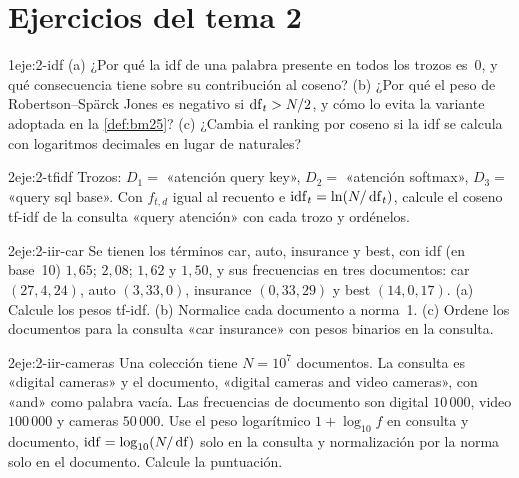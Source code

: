 \section*{Ejercicios del tema 2}

\begin{ejercicio}{1}{eje:2-idf}
(a) ¿Por qué la idf de una palabra presente en todos los trozos es~0, y qué consecuencia tiene sobre su contribución al coseno? (b) ¿Por qué el peso de Robertson--Spärck Jones es negativo si $\operatorname{df}_t>N/2$, y cómo lo evita la variante adoptada en la \cref{def:bm25}? (c) ¿Cambia el ranking por coseno si la idf se calcula con logaritmos decimales en lugar de naturales?
\end{ejercicio}

\begin{ejercicio}{2}{eje:2-tfidf}
Trozos: $D_1=$ «atención query key», $D_2=$ «atención softmax», $D_3=$ «query sql base». Con $f_{t,d}$ igual al recuento e $\operatorname{idf}_t=\ln(N/\operatorname{df}_t)$, calcule el coseno tf-idf de la consulta «query atención» con cada trozo y ordénelos.
\end{ejercicio}

\begin{ejercicio}{2}{eje:2-iir-car}
Se tienen los términos car, auto, insurance y best, con idf (en base~10) $1{,}65$; $2{,}08$; $1{,}62$ y $1{,}50$, y sus frecuencias en tres documentos: car $(27,4,24)$, auto $(3,33,0)$, insurance $(0,33,29)$ y best $(14,0,17)$. (a) Calcule los pesos tf-idf. (b) Normalice cada documento a norma~1. (c) Ordene los documentos para la consulta «car insurance» con pesos binarios en la consulta.
\end{ejercicio}

\begin{ejercicio}{2}{eje:2-iir-cameras}
Una colección tiene $N=10^{7}$ documentos. La consulta es «digital cameras» y el documento, «digital cameras and video cameras», con «and» como palabra vacía. Las frecuencias de documento son digital $10\,000$, video $100\,000$ y cameras $50\,000$. Use el peso logarítmico $1+\log_{10}f$ en consulta y documento, $\operatorname{idf}=\log_{10}(N/\operatorname{df})$ solo en la consulta y normalización por la norma solo en el documento. Calcule la puntuación.
\end{ejercicio}

